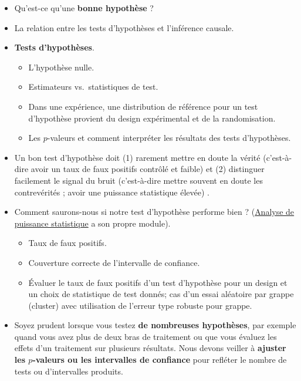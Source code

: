 \documentclass[
  12pt,
]{book}
\begin{document}
\begin{itemize}
\item
  Qu'est-ce qu'une \textbf{bonne hypothèse} ?
\item
  La relation entre les tests d'hypothèses et l'inférence causale.
\item
  \textbf{Tests d'hypothèses}.

  \begin{itemize}
  \item
    L'hypothèse nulle.
  \item
    Estimateurs vs.~statistiques de test.
  \item
    Dans une expérience, une distribution de référence pour un test d'hypothèse provient du design expérimental et de la randomisation.
  \item
    Les \(p\)-valeurs et comment interpréter les résultats des tests d'hypothèses.
  \end{itemize}
\item
  Un bon test d'hypothèse doit (1) rarement mettre en doute la vérité (c'est-à-dire avoir un taux de faux positifs contrôlé et faible) et (2) distinguer facilement le signal du bruit (c'est-à-dire mettre souvent en doute les contrevérités ; avoir une puissance statistique élevée) .
\item
  Comment saurons-nous si notre test d'hypothèse performe bien ? (\href{statistical-power-and-design-diagnosands.html}{Analyse de puissance statistique} a son propre module).

  \begin{itemize}
  \item
    Taux de faux positifs.
  \item
    Couverture correcte de l'intervalle de confiance.
  \item
    Évaluer le taux de faux positifs d'un test d'hypothèse pour un design et un choix de statistique de test donnés;
    cas d'un essai aléatoire par grappe (cluster) avec utilisation de l'erreur type robuste pour grappe.
  \end{itemize}
\item
  Soyez prudent lorsque vous testez \textbf{de nombreuses hypothèses}, par exemple quand vous avez plus de deux bras de traitement ou que vous évaluez les effets d'un traitement sur plusieurs résultats. Nous devons veiller à \textbf{ajuster les \(p\)-valeurs ou les intervalles de confiance} pour refléter le nombre de tests ou d'intervalles produits.
\end{itemize}
\end{document}
